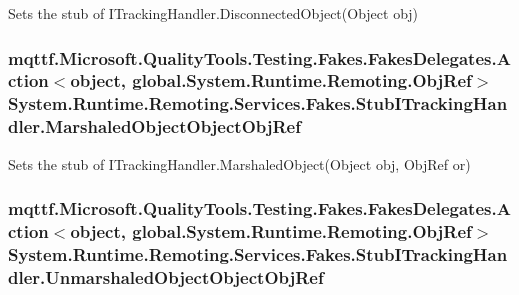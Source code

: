 Sets the stub of I\-Tracking\-Handler.\-Disconnected\-Object(\-Object obj)

\hypertarget{class_system_1_1_runtime_1_1_remoting_1_1_services_1_1_fakes_1_1_stub_i_tracking_handler_afd033d49fca9c93a274cfc5e05d43698}{
\subsubsection[{Marshaled\-Object\-Object\-Obj\-Ref}]{\setlength{\rightskip}{0pt plus 5cm}mqttf.\-Microsoft.\-Quality\-Tools.\-Testing.\-Fakes.\-Fakes\-Delegates.\-Action$<$object, global.\-System.\-Runtime.\-Remoting.\-Obj\-Ref$>$ System.\-Runtime.\-Remoting.\-Services.\-Fakes.\-Stub\-I\-Tracking\-Handler.\-Marshaled\-Object\-Object\-Obj\-Ref}}\label{class_system_1_1_runtime_1_1_remoting_1_1_services_1_1_fakes_1_1_stub_i_tracking_handler_afd033d49fca9c93a274cfc5e05d43698}


Sets the stub of I\-Tracking\-Handler.\-Marshaled\-Object(\-Object obj, Obj\-Ref or)

\hypertarget{class_system_1_1_runtime_1_1_remoting_1_1_services_1_1_fakes_1_1_stub_i_tracking_handler_af11cda62ad5f75391507567e2d947a46}{
\subsubsection[{Unmarshaled\-Object\-Object\-Obj\-Ref}]{\setlength{\rightskip}{0pt plus 5cm}mqttf.\-Microsoft.\-Quality\-Tools.\-Testing.\-Fakes.\-Fakes\-Delegates.\-Action$<$object, global.\-System.\-Runtime.\-Remoting.\-Obj\-Ref$>$ System.\-Runtime.\-Remoting.\-Services.\-Fakes.\-Stub\-I\-Tracking\-Handler.\-Unmarshaled\-Object\-Object\-Obj\-Ref}}\label{class_system_1_1_runtime_1_1_remoting_1_1_services_1_1_fakes_1_1_stub_i_tracking_handler_af11cda62ad5f75391507567e2d947a46}


